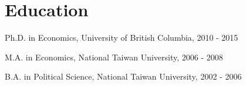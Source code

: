 \documentclass[10pt,letterpaper]{article}
\renewenvironment{itemize}{
  \begin{list}{}{
      \setlength{\leftmargin}{1.5em}
      \setlength{\itemsep}{0.25em}
      \setlength{\parskip}{0pt}
      \setlength{\parsep}{0.25em}
    }
}{
  \end{list}
}
\begin{document}
%

%

\section*{\textbf{Education}}

\begin{itemize}
  \item Ph.D. in Economics, University of British Columbia, 2010 - 2015
  \item M.A. in Economics, National Taiwan University, 2006 - 2008
  \item B.A. in Political Science, National Taiwan University, 2002 - 2006
\end{itemize}
\end{document}
